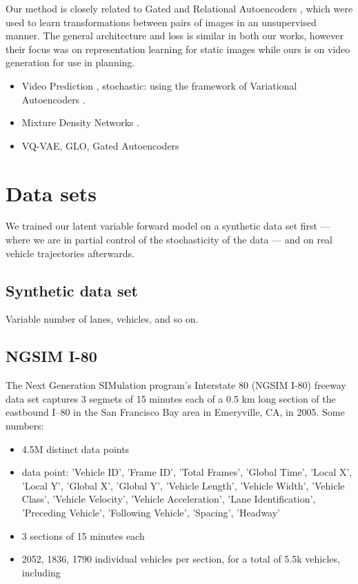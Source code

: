 \documentclass{article}
\begin{document}
Our method is closely related to Gated and Relational Autoencoders \citep{RelationalAE, GAE}, which were used to learn transformations between pairs of images in an unsupervised manner.
The general architecture and loss is similar in both our works, however their focus was on representation learning for static images while ours is on video generation for use in planning.
\begin{itemize}
\item Video Prediction \citep{mathieu-iclr-2016}, stochastic:  using the framework of Variational Autoencoders \citep{VAE}.
\item Mixture Density Networks \citep{mixture-density-networks}.
\item VQ-VAE, GLO, Gated Autoencoders
\end{itemize}


\section{Data sets}
We trained our latent variable forward model on a synthetic data set first --- where we are in partial control of the stochasticity of the data --- and on real vehicle trajectories afterwards.

\subsection{Synthetic data set}
Variable number of lanes, vehicles, and so on.  %

\subsection{NGSIM I-80}
The Next Generation SIMulation program's Interstate 80 (NGSIM I-80) freeway data set \cite{halkias2006ngsim} captures 3 segmets of 15 minutes each of a 0.5 km long section of the eastbound I–80 in the San Francisco Bay area in Emeryville, CA, in 2005.
Some numbers:
\begin{itemize}
  \item 4.5M distinct data points
  \item data point: 'Vehicle ID', 'Frame ID', 'Total Frames', 'Global Time', 'Local X', 'Local Y', 'Global X', 'Global Y', 'Vehicle Length', 'Vehicle Width', 'Vehicle Class', 'Vehicle Velocity', 'Vehicle Acceleration', 'Lane Identification', 'Preceding Vehicle', 'Following Vehicle', 'Spacing', 'Headway'
  \item 3 sections of 15 minutes each
  \item 2052, 1836, 1790 individual vehicles per section, for a total of 5.5k vehicles, including

\end{itemize}
\end{document}
